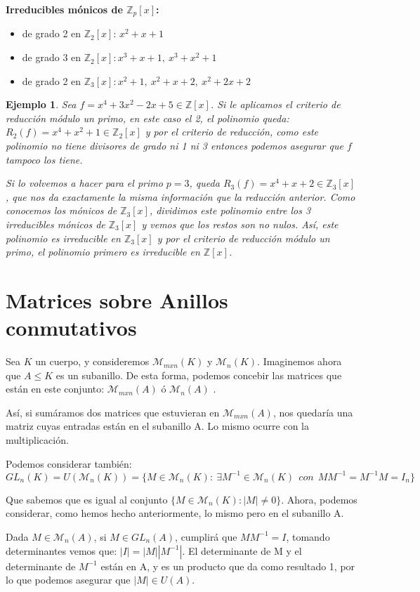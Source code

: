 \documentclass[11pt, a4paper, titlepage]{article}
\providecommand{\ent}{\mathbb{Z}}
\theoremstyle{theorem-style}
\theoremstyle{definition-style}
\theoremstyle{remark-style}
\theoremstyle{example-style}
\newtheorem*{ejemplo}{Ejemplo}
\begin{document}
\textbf{Irreducibles mónicos de $\ent_p[x]$:}
\begin{itemize}
	\item de grado 2 en $\ent_2[x]$: $x^2+x+1$
	\item de grado 3 en $\ent_2[x]: x^3+x+1,\ x^3+x^2+1$
	\item de grado 2 en $\ent_3[x]: x^2+1,\ x^2+x+2,\ x^2+2x+2$
\end{itemize}
\begin{ejemplo}
	Sea $f = x^4 +3x^2 -2x +5 \in \ent[x]$. Si le aplicamos el criterio de reducción módulo un primo, en este caso el 2, el polinomio queda: $R_2(f) = x^4 + x^2 +1 \in \ent_2[x]$ y por el criterio de reducción, como este polinomio no tiene divisores de grado ni 1 ni 3 entonces podemos asegurar que $f$ tampoco los tiene.
	
	Si lo volvemos a hacer para el primo $p=3$, queda $R_3(f) = x^4 + x + 2 \in \ent_3[x]$ , que nos da exactamente la misma información que la reducción anterior. Como conocemos los mónicos de $\ent_3[x]$, dividimos este polinomio entre los 3 irreducibles mónicos de $\ent_3[x]$ y vemos que los restos son no nulos. Así, este polinomio es irreducible en $\ent_3[x]$ y por el criterio de reducción módulo un primo, el polinomio primero es irreducible en $\ent[x]$.
\end{ejemplo}



\section{Matrices sobre Anillos conmutativos}
Sea $K$ un cuerpo, y consideremos $\mathcal{M}_{mxn}(K)$ y  $\mathcal{M}_{n}(K)$. Imaginemos ahora que $A\leq K$ es un subanillo. De esta forma, podemos concebir las matrices que están en este conjunto: $\mathcal{M}_{mxn}(A)$ ó  $\mathcal{M}_{n}(A)$ .

Así, si sumáramos dos matrices que estuvieran en  $\mathcal{M}_{mxn}(A)$, nos quedaría una matriz cuyas entradas están en el subanillo A. Lo mismo ocurre con la multiplicación. 


Podemos considerar también:
\[
GL_n(K) = U (\mathcal{M}_n(K)) = \{ M \in \mathcal{M}_n(K) :  \ \exists M^{-1} \in \mathcal{M}_n(K) \ \ con \ \ MM^{-1} = M^{-1}M = I_n\}
\]

Que sabemos que es igual al conjunto $\{M \in \mathcal{M}_n(K) : | M | \ne 0\}$. Ahora, podemos considerar, como hemos hecho anteriormente, lo mismo pero en el subanillo A.

Dada $M \in \mathcal{M}_n(A)$, si $M \in GL_n(A)$, cumplirá que $MM^{-1} = I$, tomando determinantes vemos que: $|I|=|M||M^{-1}|$. El determinante de M y el determinante de $M^{-1}$ están en A, y es un producto que da como resultado 1, por lo que podemos asegurar que $|M| \in U(A)$.
\end{document}
